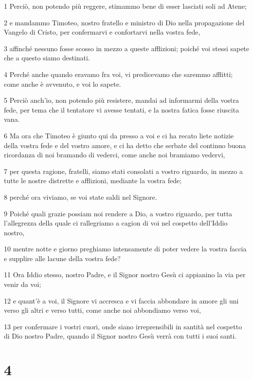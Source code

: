 \par 1 Perciò, non potendo più reggere, stimammo bene di esser lasciati soli ad Atene;
\par 2 e mandammo Timoteo, nostro fratello e ministro di Dio nella propagazione del Vangelo di Cristo, per confermarvi e confortarvi nella vostra fede,
\par 3 affinché nessuno fosse scosso in mezzo a queste afflizioni; poiché voi stessi sapete che a questo siamo destinati.
\par 4 Perché anche quando eravamo fra voi, vi predicevamo che saremmo afflitti; come anche è avvenuto, e voi lo sapete.
\par 5 Perciò anch'io, non potendo più resistere, mandai ad informarmi della vostra fede, per tema che il tentatore vi avesse tentati, e la nostra fatica fosse riuscita vana.
\par 6 Ma ora che Timoteo è giunto qui da presso a voi e ci ha recato liete notizie della vostra fede e del vostro amore, e ci ha detto che serbate del continuo buona ricordanza di noi bramando di vederci, come anche noi bramiamo vedervi,
\par 7 per questa ragione, fratelli, siamo stati consolati a vostro riguardo, in mezzo a tutte le nostre distrette e afflizioni, mediante la vostra fede;
\par 8 perché ora viviamo, se voi state saldi nel Signore.
\par 9 Poiché quali grazie possiam noi rendere a Dio, a vostro riguardo, per tutta l'allegrezza della quale ci rallegriamo a cagion di voi nel cospetto dell'Iddio nostro,
\par 10 mentre notte e giorno preghiamo intensamente di poter vedere la vostra faccia e supplire alle lacune della vostra fede?
\par 11 Ora Iddio stesso, nostro Padre, e il Signor nostro Gesù ci appianino la via per venir da voi;
\par 12 e quant'è a voi, il Signore vi accresca e vi faccia abbondare in amore gli uni verso gli altri e verso tutti, come anche noi abbondiamo verso voi,
\par 13 per confermare i vostri cuori, onde siano irreprensibili in santità nel cospetto di Dio nostro Padre, quando il Signor nostro Gesù verrà con tutti i suoi santi.

\chapter{4}

